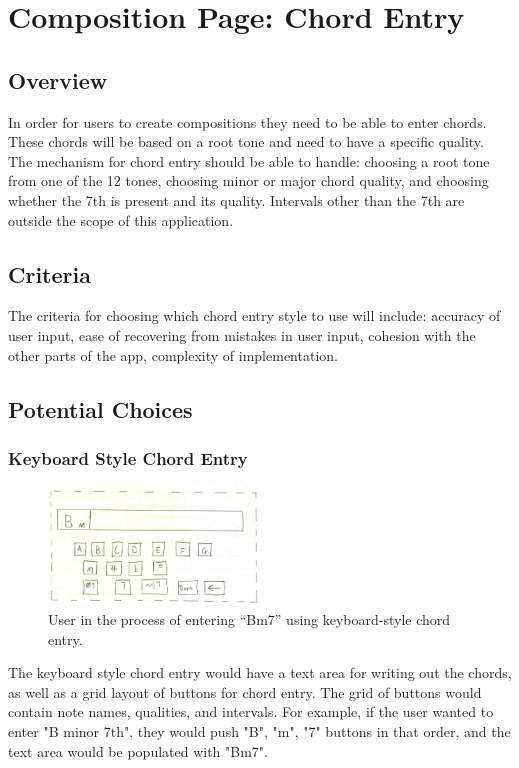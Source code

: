 \documentclass[onecolumn, draftclsnofoot,10pt, compsoc]{IEEEtran}
\begin{document}
\section{Composition Page: Chord Entry}
\subsection{Overview}
In order for users to create compositions they need to be able to enter chords. 
These chords will be based on a root tone and need to have a specific quality. 
The mechanism for chord entry should be able to handle: 
choosing a root tone from one of the 12 tones, 
choosing minor or major chord quality, 
and choosing whether the 7th is present and its quality. 
Intervals other than the 7th are outside the scope of this application. 
\subsection{Criteria}
The criteria for choosing which chord entry style to use will include:
accuracy of user input,
ease of recovering from mistakes in user input,
cohesion with the other parts of the app,
complexity of implementation.

\subsection{Potential Choices}
\subsubsection{Keyboard Style Chord Entry}
\begin{figure}[h]
  \includegraphics[width=0.5\textwidth]{keyboard.png}
  \caption{User in the process of entering ``Bm7'' using keyboard-style chord entry.}
\end{figure}

The keyboard style chord entry would have a text area for writing out the chords, as well as a grid layout of buttons for chord entry. 
The grid of buttons would contain note names, qualities, and intervals. 
For example, if the user wanted to enter "B minor 7th", they would push "B", "m", "7" buttons in that order, and the text area would be populated with "Bm7". 
\end{document}
